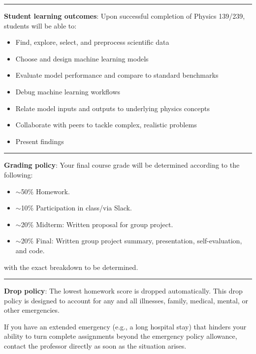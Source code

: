 \documentclass[12pt]{article}
\begin{document}
\begin{center}
  \rule{\textwidth}{0.5pt}
\end{center}

\noindent\textbf{Student learning outcomes}: Upon successful completion of Physics 139/239, students will be able to:
\begin{itemize}
  \item Find, explore, select, and preprocess scientific data
  \item Choose and design machine learning models
  \item Evaluate model performance and compare to standard benchmarks
  \item Debug machine learning workflows
  \item Relate model inputs and outputs to underlying physics concepts
  \item Collaborate with peers to tackle complex, realistic problems
  \item Present findings
\end{itemize}

\begin{center}
  \rule{\textwidth}{0.5pt}
\end{center}

\noindent\textbf{Grading policy}: Your final course grade will be determined according to the following:
\begin{itemize}
  \item $\sim$50\% Homework.
  \item $\sim$10\% Participation in class/via Slack.
  \item $\sim$20\% Midterm: Written proposal for group project.
  \item $\sim$20\% Final: Written group project summary, presentation, self-evaluation, and code.
\end{itemize}
with the exact breakdown to be determined.

\begin{center}
  \rule{\textwidth}{0.5pt}
\end{center}

\noindent\textbf{Drop policy}: The lowest homework score is dropped automatically.
This drop policy is designed to account for any and all illnesses, family, medical, mental, or other emergencies.

If you have an extended emergency (e.g., a long hospital stay) that hinders your ability to turn complete assignments beyond the emergency policy allowance, contact the professor directly as soon as the situation arises.
\end{document}

